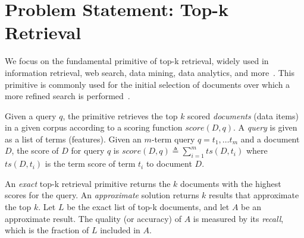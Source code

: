 


\section{Problem Statement: Top-k Retrieval}
\label{sec:problem}

We focus on the fundamental primitive of top-k retrieval, widely used in information retrieval, web search, data mining, data analytics, and more~\cite{top-k-survey}. 
This primitive is commonly used for the initial selection of documents over which a more refined search is performed~\cite{Wang:2011}. 

Given a query $q$, the primitive retrieves the top $k$ scored  \emph{documents} (data items) in a given corpus
according to a scoring function $\textit{score}(D, q)$.  
A \emph{query} is given as a list of terms (features). Given an $m$-term query $q = t_1, \dots t_m$ and a document $D$, the score of $D$ for query $q$ is 
$\textit{score}(D, q) \triangleq \sum_{i=1}^m ts(D, t_i)$ 
where $ts(D, t_i)$ is the term score of term $t_i$ to document $D$. 

An \emph{exact} top-k retrieval primitive returns the $k$ documents with the highest scores for the query.
An \emph{approximate} solution returns $k$ results that approximate the top $k$. 
Let $L$ be the exact list of top-k documents,  
and let $A$ be an approximate result. 
The quality (or accuracy) of  $A$ is measured by its
\emph{recall}, which is  the fraction of $L$ included in $A$.



